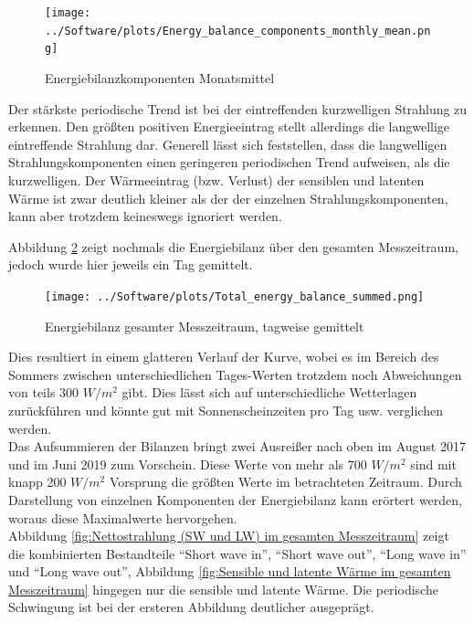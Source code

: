 \documentclass[12pt,a4paper]{article}
\begin{document}
\begin{figure}[H]
\centering
\texttt{[image: ../Software/plots/Energy\_balance\_components\_monthly\_mean.png]}
\caption{Energiebilanzkomponenten Monatsmittel}
\label{Energiebilanzkomponenten Monatsmittel}
\end{figure}

Der stärkste periodische Trend ist bei der eintreffenden kurzwelligen Strahlung zu erkennen. Den größten positiven Energieeintrag stellt allerdings die langwellige eintreffende Strahlung dar. Generell lässt sich feststellen, dass die langwelligen Strahlungskomponenten einen geringeren periodischen Trend aufweisen, als die kurzwelligen. Der Wärmeeintrag (bzw. Verlust) der sensiblen und latenten Wärme ist zwar deutlich kleiner als der der einzelnen Strahlungskomponenten, kann aber trotzdem keineswegs ignoriert werden. 



\pagebreak
Abbildung \ref{Energiebilanz gesamter Messzeitraum, tagweise gemittelt} zeigt nochmals die Energiebilanz über den gesamten Messzeitraum, jedoch wurde hier jeweils ein Tag gemittelt.

\begin{figure}[H]
\centering
\texttt{[image: ../Software/plots/Total\_energy\_balance\_summed.png]}
\caption{Energiebilanz gesamter Messzeitraum, tagweise gemittelt}
\label{Energiebilanz gesamter Messzeitraum, tagweise gemittelt}
\end{figure}

Dies resultiert in einem glatteren Verlauf der Kurve, wobei es im Bereich des Sommers zwischen unterschiedlichen Tages-Werten trotzdem noch Abweichungen von teils 300 $W/m^2$ gibt. Dies lässt sich auf unterschiedliche Wetterlagen zurückführen und könnte gut mit Sonnenscheinzeiten pro Tag usw. verglichen werden.\\
Das Aufsummieren der Bilanzen bringt zwei Ausreißer nach oben im August 2017 und im Juni 2019 zum Vorschein. Diese Werte von mehr als 700 $W/m^2$ sind mit knapp 200 $W/m^2$ Vorsprung die größten Werte im betrachteten Zeitraum. Durch Darstellung von einzelnen Komponenten der Energiebilanz kann erörtert werden, woraus diese Maximalwerte hervorgehen.\\

Abbildung \ref{fig:Nettostrahlung (SW und LW) im gesamten Messzeitraum} zeigt die kombinierten Bestandteile ``Short wave in'', ``Short wave out'', ``Long wave in'' und ``Long wave out'', Abbildung \ref{fig:Sensible und latente Wärme im gesamten Messzeitraum} hingegen nur die sensible und latente Wärme. Die periodische Schwingung ist bei der ersteren Abbildung deutlicher ausgeprägt.
\end{document}
